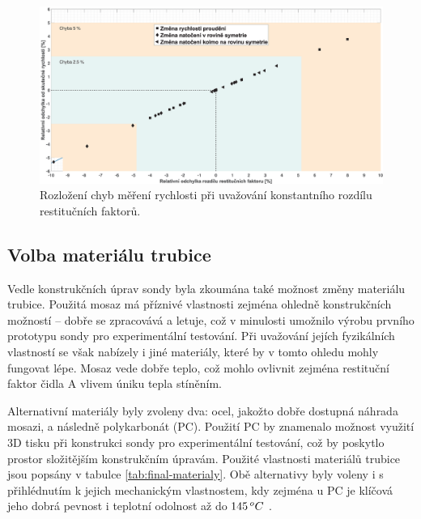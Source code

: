             \begin{figure}[ht!]
                \centering
                \includegraphics*[width=\textwidth]{500_FINAL/final_chyba_mereni.eps}
                \caption{Rozložení chyb měření rychlosti při uvažování konstantního rozdílu restitučních faktorů.}
                \label{fig:sonda-final-chyba-mereni}
            \end{figure}

        \newpage
        \subsection{Volba materiálu trubice}
            Vedle konstrukčních úprav sondy byla zkoumána také možnost změny materiálu trubice. Použitá mosaz má příznivé vlastnosti zejména ohledně konstrukčních možností – dobře se zpracovává a letuje, což v minulosti umožnilo výrobu prvního prototypu sondy pro experimentální testování. Při uvažování jejích fyzikálních vlastností se však nabízely i jiné materiály, které by v tomto ohledu mohly fungovat lépe. Mosaz vede dobře teplo, což mohlo ovlivnit zejména restituční faktor čidla A vlivem úniku tepla stíněním.

            Alternativní materiály byly zvoleny dva: ocel, jakožto dobře dostupná náhrada mosazi, a následně polykarbonát (PC). Použití PC by znamenalo možnost využití 3D tisku při konstrukci sondy pro experimentální testování, což by poskytlo prostor složitějším konstrukčním úpravám. Použité vlastnosti materiálů trubice jsou popsány v tabulce \ref{tab:final-materialy}. Obě alternativy byly voleny i s přihlédnutím k jejich mechanickým vlastnostem, kdy zejména u PC je klíčová jeho dobrá pevnost i teplotní odolnost až do $145 \, ^oC$ \cite{Morgan1976}.

